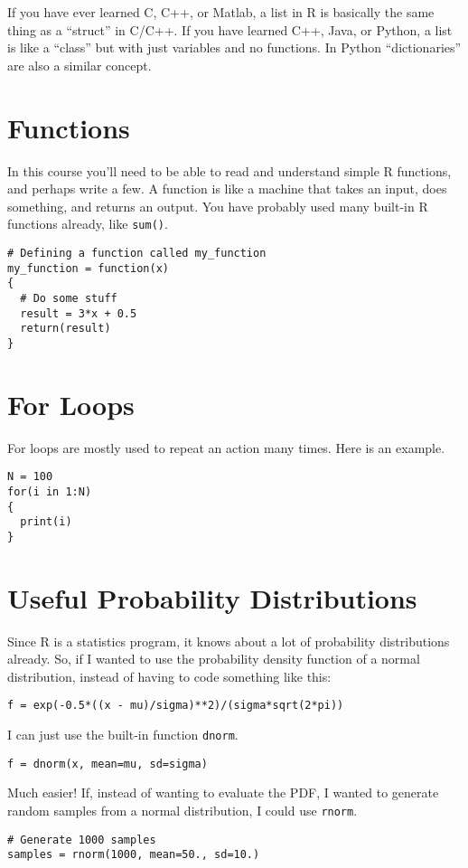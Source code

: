 If you have ever learned C, C++, or Matlab, a list in R is basically the same thing as
a ``struct'' in C/C++. If you have learned C++, Java, or Python, a list is
like a ``class'' but with just variables and no functions. In Python ``dictionaries''
are also a similar concept.

\section{Functions}
In this course you'll need to be able to read and understand simple R
functions, and perhaps write a few. A function is like a machine that takes
an input, does something, and returns an output. You have probably used many
built-in R functions already, like {\tt sum()}.

\begin{verbatim}
# Defining a function called my_function
my_function = function(x)
{
  # Do some stuff
  result = 3*x + 0.5
  return(result)
}
\end{verbatim}


\section{For Loops}
For loops are mostly used to repeat an action many times. Here is an example.
\begin{verbatim}
N = 100
for(i in 1:N)
{
  print(i)
}
\end{verbatim}

\section{Useful Probability Distributions}
Since R is a statistics program, it knows about a lot of probability
distributions already. So, if I wanted to use the probability density function
of a normal distribution, instead of having to code something like this:
\begin{verbatim}
f = exp(-0.5*((x - mu)/sigma)**2)/(sigma*sqrt(2*pi))
\end{verbatim}
I can just use the built-in function {\tt dnorm}.
\begin{verbatim}
f = dnorm(x, mean=mu, sd=sigma)
\end{verbatim}
Much easier! If, instead of wanting to evaluate the PDF, I wanted to generate
random samples from a normal distribution, I could use {\tt rnorm}.
\begin{verbatim}
# Generate 1000 samples
samples = rnorm(1000, mean=50., sd=10.)
\end{verbatim}


